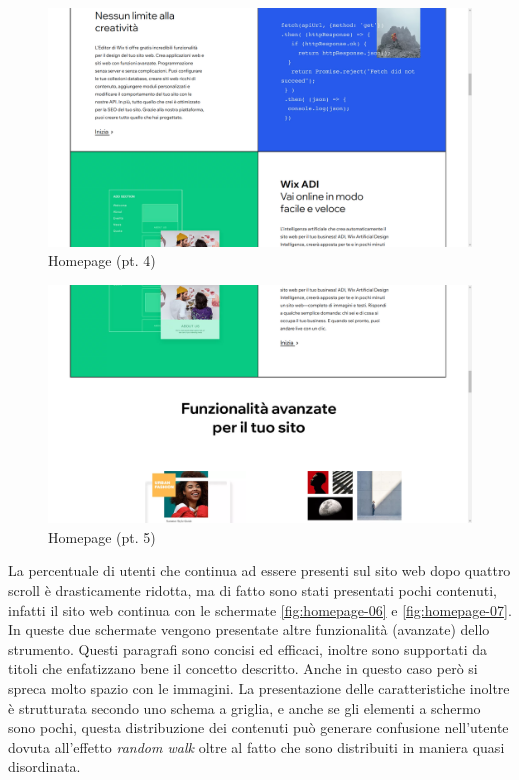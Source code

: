 \documentclass[11pt,a4paper]{article}
\begin{document}
\begin{figure}[H]
  \centering
  \includegraphics[width=1\textwidth]{img/homepage-04.png}
  \caption{Homepage (pt. 4)}
  \label{fig:homepage-04}
\end{figure}

\begin{figure}[H]
  \centering
  \includegraphics[width=1\textwidth]{img/homepage-05.png}
  \caption{Homepage (pt. 5)}
  \label{fig:homepage-05}
\end{figure}

La percentuale di utenti che continua ad essere presenti sul sito web
dopo quattro scroll è drasticamente ridotta, ma di fatto sono stati
presentati pochi contenuti, infatti il sito web continua con le
schermate \ref{fig:homepage-06} e \ref{fig:homepage-07}. In queste due
schermate vengono presentate altre funzionalità (avanzate) dello
strumento. Questi paragrafi sono concisi ed efficaci, inoltre sono
supportati da titoli che enfatizzano bene il concetto descritto. Anche
in questo caso però si spreca molto spazio con le immagini. La
presentazione delle caratteristiche inoltre è strutturata secondo uno
schema a griglia, e anche se gli elementi a schermo sono pochi, questa
distribuzione dei contenuti può generare confusione nell'utente dovuta
all'effetto \textit{random walk} oltre al fatto che sono distribuiti
in maniera quasi disordinata.
\end{document}

